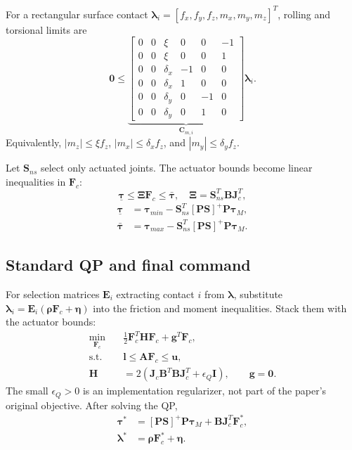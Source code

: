 \documentclass[11pt]{article}
\newcommand{\vect}[1]{\bm{#1}}
\newcommand{\pinv}{^{+}}
\begin{document}
For a rectangular surface contact
$\vect\lambda_i=[f_x,f_y,f_z,m_x,m_y,m_z]^T$, rolling and torsional limits are
\begin{equation}
\vect0\le
\underbrace{\begin{bmatrix}
0&0&\xi&0&0&-1\\
0&0&\xi&0&0& 1\\
0&0&\delta_x&-1&0&0\\
0&0&\delta_x& 1&0&0\\
0&0&\delta_y&0&-1&0\\
0&0&\delta_y&0& 1&0
\end{bmatrix}}_{\vect C_{m,i}}
\vect\lambda_i.
\tag{PIDC-17}
\end{equation}
Equivalently,
$|m_z|\le\xi f_z$, $|m_x|\le\delta_xf_z$, and
$|m_y|\le\delta_yf_z$.

Let $\vect S_{ns}$ select only actuated joints. The actuator bounds become
linear inequalities in $\vect F_c$:
\begin{equation}
\underline{\vect\tau}\le\vect\Xi\vect F_c\le\bar{\vect\tau},
\quad
\vect\Xi=\vect S_{ns}^T\vect B\vect J_c^T,
\tag{PIDC-18}
\end{equation}
\begin{equation}
\begin{split}
\underline{\vect\tau}&=\vect\tau_{min}
-\vect S_{ns}^T[\vect P\vect S]\pinv\vect P\vect\tau_M,\\
\bar{\vect\tau}&=\vect\tau_{max}
-\vect S_{ns}^T[\vect P\vect S]\pinv\vect P\vect\tau_M.
\end{split}
\tag{PIDC-19}
\end{equation}

\subsection*{Standard QP and final command}
For selection matrices $\vect E_i$ extracting contact $i$ from
$\vect\lambda$, substitute
$\vect\lambda_i=\vect E_i(\vect\rho\vect F_c+\vect\eta)$ into
the friction and moment inequalities. Stack them with the actuator bounds:
\begin{equation}
\begin{aligned}
\min_{\vect F_c}\quad&
\tfrac12\vect F_c^T\vect H\vect F_c+\vect g^T\vect F_c,\\
\text{s.t.}\quad&\vect l\le\vect A\vect F_c\le\vect u,\\
\vect H&=2(\vect J_c\vect B^T\vect B\vect J_c^T
+\epsilon_Q\vect I),\qquad \vect g=\vect0.
\end{aligned}
\tag{PIDC-20}
\end{equation}
The small $\epsilon_Q>0$ is an implementation regularizer, not part of the
paper's original objective. After solving the QP,
\begin{align}
\vect\tau^*&=[\vect P\vect S]\pinv\vect P\vect\tau_M
+\vect B\vect J_c^T\vect F_c^*, \tag{PIDC-21a}\\
\vect\lambda^*&=\vect\rho\vect F_c^*+\vect\eta. \tag{PIDC-21b}
\end{align}
\end{document}
